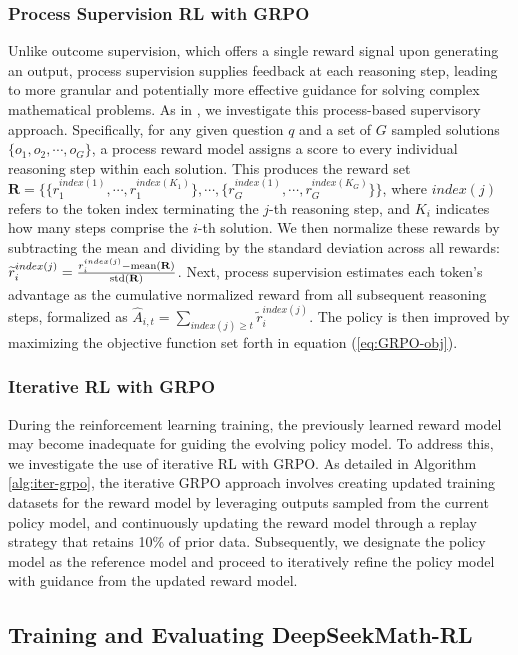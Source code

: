 \begin{itemize}[topsep=0pt]
\begin{itemize}[topsep=0pt]
\subsubsection{Process Supervision RL with GRPO} Unlike outcome supervision, which offers a single reward signal upon generating an output, process supervision supplies feedback at each reasoning step, leading to more granular and potentially more effective guidance for solving complex mathematical problems. As in \cite{wang2023math}, we investigate this process-based supervisory approach. Specifically, for any given question $q$ and a set of $G$ sampled solutions $\{o_1, o_2, \cdots, o_G\}$, a process reward model assigns a score to every individual reasoning step within each solution. This produces the reward set $\mathbf{R} = \{ \{r_1^{index(1)},\cdots,r_1^{index(K_1)}\}, \cdots,  \{r_G^{index(1)},\cdots,r_G^{index(K_G)}\} \}$, where $index(j)$ refers to the token index terminating the $j$-th reasoning step, and $K_i$ indicates how many steps comprise the $i$-th solution. We then normalize these rewards by subtracting the mean and dividing by the standard deviation across all rewards: $\widetilde{r}_i^{index(j)} = \frac{r_i^{index(j)} - {\rm mean(\mathbf{R})}}{{\rm std(\mathbf{R})}}$.
Next, process supervision estimates each token’s advantage as the cumulative normalized reward from all subsequent reasoning steps, formalized as $\hat{A}_{i, t} = \sum_{index(j) \ge t} \widetilde{r}_i^{index(j)}$.
The policy is then improved by maximizing the objective function set forth in equation (\ref{eq:GRPO-obj}).

\subsubsection{Iterative RL with GRPO} During the reinforcement learning training, the previously learned reward model may become inadequate for guiding the evolving policy model. To address this, we investigate the use of iterative RL with GRPO. As detailed in Algorithm \ref{alg:iter-grpo}, the iterative GRPO approach involves creating updated training datasets for the reward model by leveraging outputs sampled from the current policy model, and continuously updating the reward model through a replay strategy that retains 10\% of prior data. Subsequently, we designate the policy model as the reference model and proceed to iteratively refine the policy model with guidance from the updated reward model.

\subsection{Training and Evaluating DeepSeekMath-RL}


\end{itemize}
\end{itemize}
